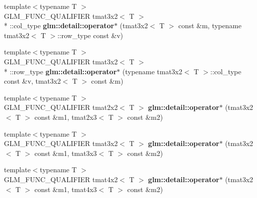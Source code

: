 \begin{DoxyCompactItemize}
\item 
\hypertarget{namespaceglm_1_1detail_a0e828f563c0f567492e21156f0586538}{{\footnotesize template$<$typename T $>$ }\\G\-L\-M\-\_\-\-F\-U\-N\-C\-\_\-\-Q\-U\-A\-L\-I\-F\-I\-E\-R tmat3x2$<$ T $>$\\*
\-::col\-\_\-type {\bfseries glm\-::detail\-::operator$\ast$} (tmat3x2$<$ T $>$ const \&m, typename tmat3x2$<$ T $>$\-::row\-\_\-type const \&v)}\label{namespaceglm_1_1detail_a0e828f563c0f567492e21156f0586538}

\item 
\hypertarget{namespaceglm_1_1detail_aaca641543e10424ba6f582a97acd9b3a}{{\footnotesize template$<$typename T $>$ }\\G\-L\-M\-\_\-\-F\-U\-N\-C\-\_\-\-Q\-U\-A\-L\-I\-F\-I\-E\-R tmat3x2$<$ T $>$\\*
\-::row\-\_\-type {\bfseries glm\-::detail\-::operator$\ast$} (typename tmat3x2$<$ T $>$\-::col\-\_\-type const \&v, tmat3x2$<$ T $>$ const \&m)}\label{namespaceglm_1_1detail_aaca641543e10424ba6f582a97acd9b3a}

\item 
\hypertarget{namespaceglm_1_1detail_af9e6e1ba1306b20d1b8b2b8a6eecade5}{{\footnotesize template$<$typename T $>$ }\\G\-L\-M\-\_\-\-F\-U\-N\-C\-\_\-\-Q\-U\-A\-L\-I\-F\-I\-E\-R tmat2x2$<$ T $>$ {\bfseries glm\-::detail\-::operator$\ast$} (tmat3x2$<$ T $>$ const \&m1, tmat2x3$<$ T $>$ const \&m2)}\label{namespaceglm_1_1detail_af9e6e1ba1306b20d1b8b2b8a6eecade5}

\item 
\hypertarget{namespaceglm_1_1detail_a9ceb24f5980ad27a0731977d687dbcd7}{{\footnotesize template$<$typename T $>$ }\\G\-L\-M\-\_\-\-F\-U\-N\-C\-\_\-\-Q\-U\-A\-L\-I\-F\-I\-E\-R tmat3x2$<$ T $>$ {\bfseries glm\-::detail\-::operator$\ast$} (tmat3x2$<$ T $>$ const \&m1, tmat3x3$<$ T $>$ const \&m2)}\label{namespaceglm_1_1detail_a9ceb24f5980ad27a0731977d687dbcd7}

\item 
\hypertarget{namespaceglm_1_1detail_aa1d870dc8b77a44aeae02ffe1a36bc07}{{\footnotesize template$<$typename T $>$ }\\G\-L\-M\-\_\-\-F\-U\-N\-C\-\_\-\-Q\-U\-A\-L\-I\-F\-I\-E\-R tmat4x2$<$ T $>$ {\bfseries glm\-::detail\-::operator$\ast$} (tmat3x2$<$ T $>$ const \&m1, tmat4x3$<$ T $>$ const \&m2)}\label{namespaceglm_1_1detail_aa1d870dc8b77a44aeae02ffe1a36bc07}


\end{DoxyCompactItemize}
